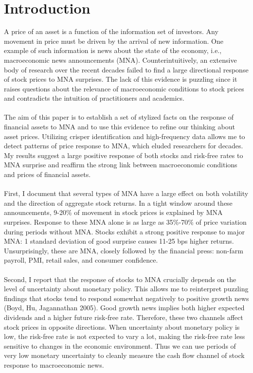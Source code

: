 \documentclass[12pt]{article}
\begin{document}
\clearpage
{}

\section{Introduction} 

A price of an asset is a function of the information set of investors. Any movement in price must be driven by the arrival of new information. One example of such information is news about the state of the economy, i.e., macroeconomic news announcements (MNA). Counterintuitively, an extensive body of research over the recent decades failed to find a large directional response of stock prices to MNA surprises. The lack of this evidence is puzzling since it raises questions about the relevance of macroeconomic conditions to stock prices and contradicts the intuition of practitioners and academics.
\paragraph{}
The aim of this paper is to establish a set of stylized facts on the response of financial assets to MNA and to use this evidence to refine our thinking about asset prices. Utilizing crisper identification and high-frequency data allows me to detect patterns of price response to MNA, which eluded researchers for decades. My results suggest a large positive response of both stocks and risk-free rates to MNA surprise and reaffirm the strong link between macroeconomic conditions and prices of financial assets. 
\paragraph{}
First, I document that several types of MNA have a large effect on both volatility and the direction of aggregate stock returns. In a tight window around these announcements, 9-20\% of movement in stock prices is explained by MNA surprises. Response to these MNA alone is as large as 35\%-70\% of price variation during periods without MNA. Stocks exhibit a strong positive response to major MNA: 1 standard deviation of good surprise causes 11-25 bps higher returns. Unsurprisingly, these are MNA, closely followed by the financial press: non-farm payroll, PMI, retail sales, and consumer confidence.
\paragraph{}
Second, I report that the response of stocks to MNA crucially depends on the level of uncertainty about monetary policy. This allows me to reinterpret puzzling findings that stocks tend to respond somewhat negatively to positive growth news (Boyd, Hu, Jagannathan 2005). Good growth news implies both higher expected dividends and a higher future risk-free rate. Therefore, these two channels affect stock prices in opposite directions.  When uncertainty about monetary policy is low, the risk-free rate is not expected to vary a lot, making the risk-free rate less sensitive to changes in the economic environment. Thus we can use periods of very low monetary uncertainty to cleanly measure the cash flow channel of stock response to macroeconomic news. 
\end{document}
